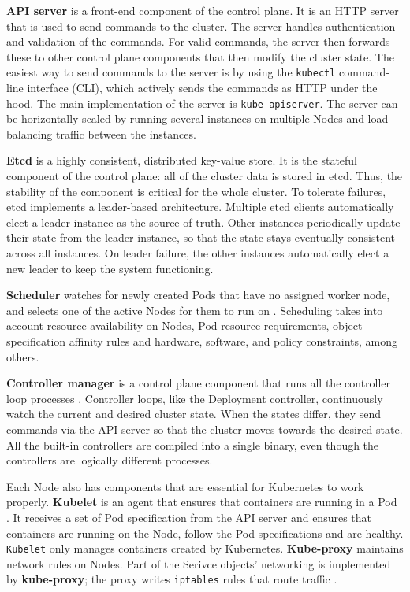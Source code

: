 \documentclass[english, 12pt, a4paper, sci, utf8, a-2b, online]{aaltothesis}
\begin{document}
\textbf{API server} is a front-end component of the control plane.
It is an HTTP server that is used to send commands to the cluster.
The server handles authentication and validation of the commands.
For valid commands, the server then forwards these to other control plane components that then modify the cluster state.
The easiest way to send commands to the server is by using the \texttt{kubectl} command-line interface (CLI), which actively sends the commands as HTTP under the hood.
The main implementation of the server is \texttt{kube-apiserver}.
The server can be horizontally scaled by running several instances on multiple Nodes and load-balancing traffic between the instances.

\textbf{Etcd} \cite{etcd} is a highly consistent, distributed key-value store.
It is the stateful component of the control plane: all of the cluster data is stored in etcd.
Thus, the stability of the component is critical for the whole cluster.
To tolerate failures, etcd implements a leader-based architecture.
Multiple etcd clients automatically elect a leader instance as the source of truth.
Other instances periodically update their state from the leader instance, so that the state stays eventually consistent across all instances.
On leader failure, the other instances automatically elect a new leader to keep the system functioning.

\textbf{Scheduler} watches for newly created Pods that have no assigned worker node, and selects one of the active Nodes for them to run on \cite{k8s-docs-control-plane}.
Scheduling takes into account resource availability on Nodes, Pod resource requirements, object specification affinity rules and hardware, software, and policy constraints, among others.

\textbf{Controller manager} is a control plane component that runs all the controller loop processes \cite{k8s-docs-control-plane}.
Controller loops, like the Deployment controller, continuously watch the current and desired cluster state.
When the states differ, they send commands via the API server so that the cluster moves towards the desired state.
All the built-in controllers are compiled into a single binary, even though the controllers are logically different processes.

Each Node also has components that are essential for Kubernetes to work properly.
\textbf{Kubelet} is an agent that ensures that containers are running in a Pod \cite{k8s-docs-control-plane}.
It receives a set of Pod specification from the API server and ensures that containers are running on the Node, follow the Pod specifications and are healthy.
\texttt{Kubelet} only manages containers created by Kubernetes.
\textbf{Kube-proxy} maintains network rules on Nodes.
Part of the Serivce objects' networking is implemented by \textbf{kube-proxy}; the proxy writes \texttt{iptables} rules that route traffic \cite{cilium-proxy-free}.
\end{document}
